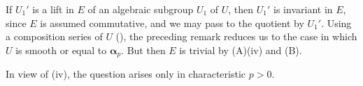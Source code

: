 If \(U_1'\) is a lift in \(E\) of an algebraic subgroup \(U_1\)
of \(U\), then \(U_1'\) is invariant in \(E\), since \(E\) is
assumed commutative, and we may pass to the quotient by \(U_1'\).
Using a composition series of \(U\) (), the preceding
remark reduces us to the case in which \(U\) is smooth or equal
to \(\boldsymbol\alpha_p\).  But then \(E\) is trivial by
(A)(iv) and (B).


In view of (iv), the question arises only in
characteristic \(p>0\).

